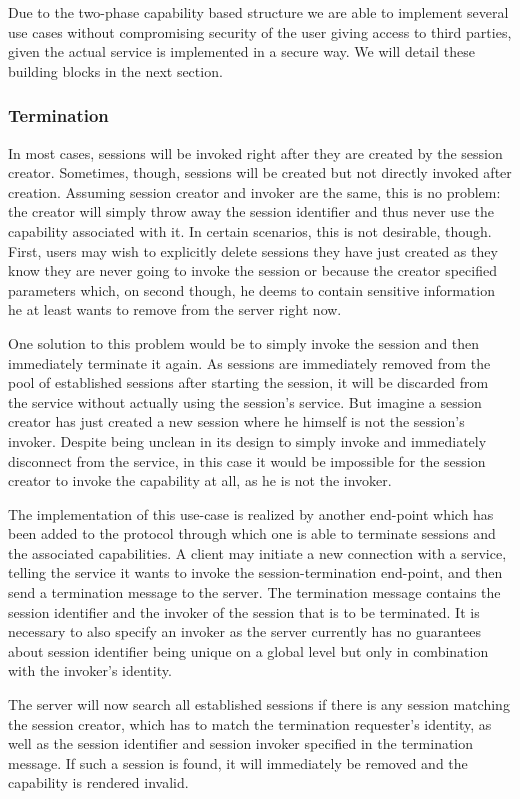 

Due to the two-phase capability based structure we are able to implement several use cases without compromising security of the user giving access to third parties, given the actual service is implemented in a secure way.
We will detail these building blocks in the next section.

\subsubsection{Termination}

In most cases, sessions will be invoked right after they are created by the session creator.
Sometimes, though, sessions will be created but not directly invoked after creation.
Assuming session creator and invoker are the same, this is no problem: the creator will simply throw away the session identifier and thus never use the capability associated with it.
In certain scenarios, this is not desirable, though.
First, users may wish to explicitly delete sessions they have just created as they know they are never going to invoke the session or because the creator specified parameters which, on second though, he deems to contain sensitive information he at least wants to remove from the server right now.

One solution to this problem would be to simply invoke the session and then immediately terminate it again.
As sessions are immediately removed from the pool of established sessions after starting the session, it will be discarded from the service without actually using the session's service.
But imagine a session creator has just created a new session where he himself is not the session's invoker.
Despite being unclean in its design to simply invoke and immediately disconnect from the service, in this case it would be impossible for the session creator to invoke the capability at all, as he is not the invoker.

The implementation of this use-case is realized by another end-point which has been added to the protocol through which one is able to terminate sessions and the associated capabilities.
A client may initiate a new connection with a service, telling the service it wants to invoke the session-termination end-point, and then send a termination message to the server.
The termination message contains the session identifier and the invoker of the session that is to be terminated.
It is necessary to also specify an invoker as the server currently has no guarantees about session identifier being unique on a global level but only in combination with the invoker's identity.

The server will now search all established sessions if there is any session matching the session creator, which has to match the termination requester's identity, as well as the session identifier and session invoker specified in the termination message.
If such a session is found, it will immediately be removed and the capability is rendered invalid.

